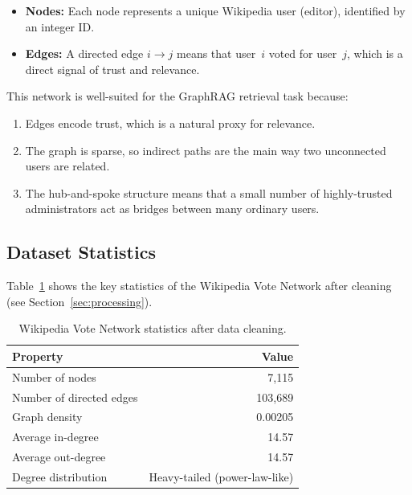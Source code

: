 \documentclass[10pt]{article}
\newcommand{\theadfont}{\bfseries\color{white}}
\begin{document}
\begin{itemize}
  \item \textbf{Nodes:} Each node represents a unique Wikipedia user (editor), identified by an integer ID.
  \item \textbf{Edges:} A directed edge $i \rightarrow j$ means that user~$i$ voted for user~$j$, which is a direct signal of trust and relevance.
\end{itemize}

This network is well-suited for the GraphRAG retrieval task because:
\begin{enumerate}
  \item Edges encode trust, which is a natural proxy for relevance.
  \item The graph is sparse, so indirect paths are the main way two unconnected users are related.
  \item The hub-and-spoke structure means that a small number of highly-trusted administrators act as bridges between many ordinary users.
\end{enumerate}

\subsection{Dataset Statistics}

Table~\ref{tab:dataset} shows the key statistics of the Wikipedia Vote Network after cleaning (see Section~\ref{sec:processing}).

\begin{table}[H]
  \centering
  \caption{Wikipedia Vote Network statistics after data cleaning.}
  \label{tab:dataset}
  \begin{tabular}{lr}
    \hline
    \rowcolor{brandblue}
    \theadfont Property & \theadfont Value \\
    \hline
    \rowcolor{lightblue}
    Number of nodes                & 7,115 \\
    Number of directed edges       & 103,689 \\
    \rowcolor{lightblue}
    Graph density                  & 0.00205 \\
    Average in-degree              & 14.57 \\
    \rowcolor{lightblue}
    Average out-degree             & 14.57 \\
    Degree distribution            & Heavy-tailed (power-law-like) \\
    \hline
  \end{tabular}
\end{table}
\end{document}
